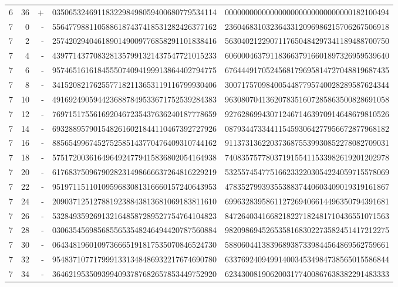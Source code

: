\begin{longtable}{rrrll}
6 & 36 & + & 0350653246911832298498059400680779534114 & 0000000000000000000000000000000182100494 \\
7 & 0 & - & 5564779881105886187437418531282426377162 & 2360468310323643312096986215706267506918 \\
7 & 2 & - & 2574202940461890149009776858291101838416 & 5630402122907117650484297341189488700750 \\
7 & 4 & - & 4397714377083281357991321437547721015233 & 6060004637911836637916601897326959539640 \\
7 & 6 & - & 9574651616184555074094199913864402794775 & 6764449170524568179695814727048819687435 \\
7 & 8 & - & 3415208217625577182113653119116799930406 & 3007175709840054487795740028289587624344 \\
7 & 10 & - & 4916924905944236887849533671752539284383 & 9630807041362078351607285863500828691058 \\
7 & 12 & - & 7697151755616920467235437636240187778659 & 9276286994307124671463970914648679810526 \\
7 & 14 & - & 6932889579015482616021844110467392727926 & 0879344733441154593064277956672877968182 \\
7 & 16 & - & 8856549967452752585143770476409310744162 & 9113731362203736875539930852278082709031 \\
7 & 18 & - & 5751720036164964924779415836802054164938 & 7408357577803719155411533982619201202978 \\
7 & 20 & - & 6176837509679028231498666637264816229219 & 5325574547751662332203054224059715578069 \\
7 & 22 & - & 9519711511010959683081316660157240643953 & 4783527993935538837440603409019319161867 \\
7 & 24 & - & 2090371251278819238843813681069183811610 & 6996328395861127269406614496350794391681 \\
7 & 26 & - & 5328493592691321648587289527754764104823 & 8472640341668218227182481710436551071563 \\
7 & 28 & - & 0306354569856855653548246494420787560884 & 9820986945265358168302273582451417212275 \\
7 & 30 & - & 0643481960109736665191817535070846524730 & 5880604413839689387339844564869562759661 \\
7 & 32 & - & 9548371077179991331348486932217674690780 & 6337692409499140034534984738565015586844 \\
7 & 34 & - & 3646219535093994093787682657853449752920 & 6234300819062003177400867638382291483333 \\

\end{longtable}
